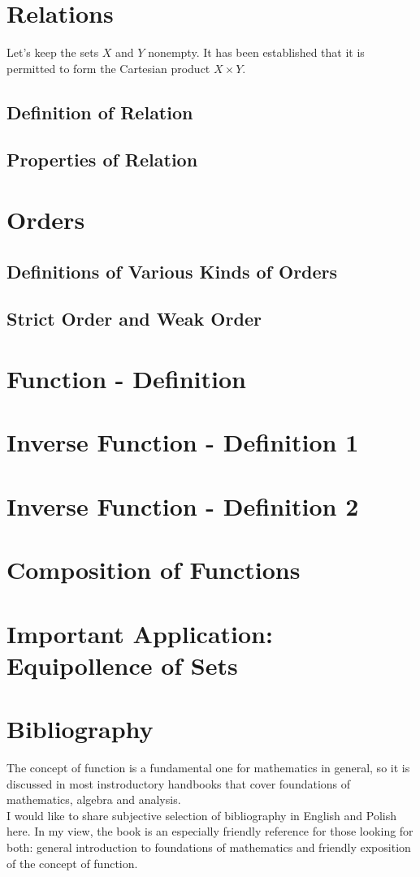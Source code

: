 \documentclass[12pt]{article}
\theoremstyle{plain}
\theoremstyle{definition}
\begin{document}
\section{Relations}
Let's keep the sets $X$ and $Y$ nonempty. It has been established that it is permitted
to form the Cartesian product $X \times Y$.
\subsection{Definition of Relation}
\subsection{Properties of Relation}
\section{Orders}
\subsection{Definitions of Various Kinds of Orders}
\subsection{Strict Order and Weak Order}
\section{Function - Definition}
\section{Inverse Function - Definition 1}
\section{Inverse Function - Definition 2}
\section{Composition of Functions}
\section{Important Application: Equipollence of Sets}

\section{Bibliography}
The concept of function is a fundamental one for mathematics in general,
 so it is discussed in most instroductory 
handbooks that cover foundations of mathematics, algebra and analysis. 
\\ \indent I would like to share subjective selection of bibliography in English 
and Polish here. In my view, the book \cite{sets_logic_computation} is an especially 
friendly reference for  those looking for both: general introduction to foundations of 
 mathematics and friendly exposition of the concept of function.



\end{document}
